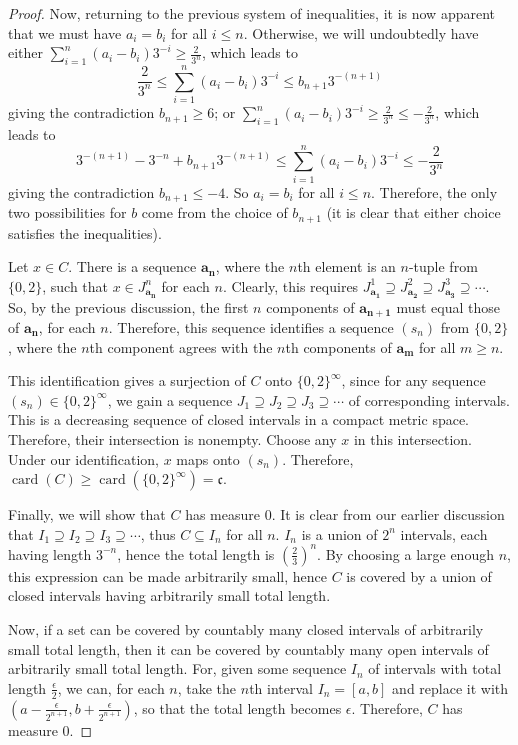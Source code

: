 \documentclass[10pt]{article}
\DeclareMathOperator*{\card}{card}
\begin{document}
\begin{enumerate}
\begin{proof}
Now, returning to the previous system of inequalities, it is now apparent that we must have $a_i = b_i$ for all $i \leq n$.  Otherwise, we will undoubtedly have either $\sum_{i=1}^n (a_i - b_i)3^{-i} \geq \frac{2}{3^n}$, which leads to
$$
\frac{2}{3^n} \leq \sum_{i=1}^n (a_i - b_i)3^{-i} \leq b_{n+1}3^{-(n+1)}
$$
giving the contradiction $b_{n+1} \geq 6$; or $\sum_{i=1}^n (a_i - b_i)3^{-i} \geq \frac{2}{3^n} \leq - \frac{2}{3^n}$, which leads to
$$
3^{-(n+1)} - 3^{-n} + b_{n+1}3^{-(n+1)} \leq \sum_{i=1}^n (a_i - b_i)3^{-i} \leq -\frac{2}{3^n}
$$
giving the contradiction $b_{n+1} \leq -4$.  So $a_i = b_i$ for all $i \leq n$.  Therefore, the only two possibilities for $b$ come from the choice of $b_{n+1}$ (it is clear that either choice satisfies the inequalities).

Let $x \in C$.  There is a sequence $\mathbf{a_n}$, where the $n$th element is an $n$-tuple from $\{0,2\}$, such that $x \in J_{\mathbf{a_n}}^n$ for each $n$.  Clearly, this requires $J_{\mathbf{a_1}}^1 \supseteq J_{\mathbf{a_2}}^2 \supseteq J_{\mathbf{a_3}}^3 \supseteq \cdots $.  So, by the previous discussion, the first $n$ components of $\mathbf{a_{n+1}}$ must equal those of $\mathbf{a_n}$, for each $n$.  Therefore, this sequence identifies a sequence $(s_n)$ from $\{0,2\}$, where the $n$th component agrees with the $n$th components of $\mathbf{a_m}$ for all $m \geq n$.

This identification gives a surjection of $C$ onto $\{0,2\}^\infty$, since for any sequence $(s_n) \in \{0,2\}^\infty$, we gain a sequence $J_{1} \supseteq J_{2} \supseteq J_{3} \supseteq \cdots$ of corresponding intervals.  This is a decreasing sequence of closed intervals in a compact metric space.  Therefore, their intersection is nonempty.  Choose any $x$ in this intersection.  Under our identification, $x$ maps onto $(s_n)$.  Therefore, $\card (C) \geq \card(\{0,2\}^\infty) = \mathfrak{c}$.

Finally, we will show that $C$ has measure $0$.  It is clear from our earlier discussion that $I_1 \supseteq I_2 \supseteq I_3 \supseteq \cdots$, thus $C \subseteq I_n$ for all $n$.  $I_n$ is a union of $2^n$ intervals, each having length $3^{-n}$, hence the total length is $(\frac23)^n$.  By choosing a large enough $n$, this expression can be made arbitrarily small, hence $C$ is covered by a union of closed intervals having arbitrarily small total length.

Now, if a set can be covered by countably many closed intervals of arbitrarily small total length, then it can be covered by countably many open intervals of arbitrarily small total length.  For, given some sequence $I_n$ of intervals with total length $\frac{\epsilon}{2}$, we can, for each $n$, take the $n$th interval $I_n = [a,b]$ and replace it with $(a - \frac{\epsilon}{2^{n+1}}, b + \frac{\epsilon}{2^{n+1}})$, so that the total length becomes $\epsilon$.  Therefore, $C$ has measure $0$.
\end{proof}


\end{enumerate}
\end{document}

